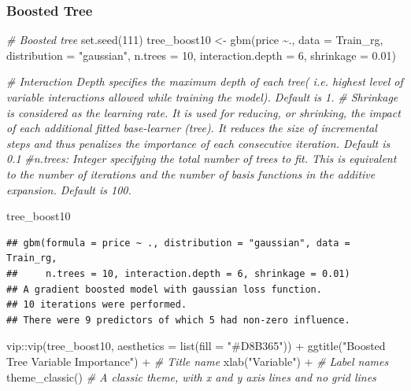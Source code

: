 \documentclass[
]{article}
\newenvironment{Shaded}{\begin{snugshade}}{\end{snugshade}}
\newcommand{\AttributeTok}[1]{\textcolor[rgb]{0.77,0.63,0.00}{#1}}
\newcommand{\CommentTok}[1]{\textcolor[rgb]{0.56,0.35,0.01}{\textit{#1}}}
\newcommand{\DecValTok}[1]{\textcolor[rgb]{0.00,0.00,0.81}{#1}}
\newcommand{\FloatTok}[1]{\textcolor[rgb]{0.00,0.00,0.81}{#1}}
\newcommand{\FunctionTok}[1]{\textcolor[rgb]{0.00,0.00,0.00}{#1}}
\newcommand{\NormalTok}[1]{#1}
\newcommand{\OtherTok}[1]{\textcolor[rgb]{0.56,0.35,0.01}{#1}}
\newcommand{\SpecialCharTok}[1]{\textcolor[rgb]{0.00,0.00,0.00}{#1}}
\newcommand{\StringTok}[1]{\textcolor[rgb]{0.31,0.60,0.02}{#1}}
\begin{document}
\hypertarget{boosted-tree}{%
\subsubsection{Boosted Tree}\label{boosted-tree}}

\begin{Shaded}
\begin{Highlighting}[]
\CommentTok{\# Boosted tree}
\FunctionTok{set.seed}\NormalTok{(}\DecValTok{111}\NormalTok{)}
\NormalTok{tree\_boost10 }\OtherTok{\textless{}{-}} \FunctionTok{gbm}\NormalTok{(price }\SpecialCharTok{\textasciitilde{}}\NormalTok{., }\AttributeTok{data =}\NormalTok{ Train\_rg, }\AttributeTok{distribution =} \StringTok{"gaussian"}\NormalTok{, }\AttributeTok{n.trees =} \DecValTok{10}\NormalTok{, }\AttributeTok{interaction.depth =} \DecValTok{6}\NormalTok{, }\AttributeTok{shrinkage =} \FloatTok{0.01}\NormalTok{)}

\CommentTok{\# Interaction Depth specifies the maximum depth of each tree( i.e. highest level of variable interactions allowed while training the model). Default is 1.}
\CommentTok{\# Shrinkage is considered as the learning rate. It is used for reducing, or shrinking, the impact of each additional fitted base{-}learner (tree).  It reduces the size of incremental steps and thus penalizes the importance of each consecutive iteration. Default is 0.1}
\CommentTok{\#n.trees: Integer specifying the total number of trees to fit. This is equivalent to the number of iterations and the number of basis functions in the additive expansion. Default is 100.}


\NormalTok{tree\_boost10}
\end{Highlighting}
\end{Shaded}

\begin{verbatim}
## gbm(formula = price ~ ., distribution = "gaussian", data = Train_rg,
##     n.trees = 10, interaction.depth = 6, shrinkage = 0.01)
## A gradient boosted model with gaussian loss function.
## 10 iterations were performed.
## There were 9 predictors of which 5 had non-zero influence.
\end{verbatim}

\begin{Shaded}
\begin{Highlighting}[]
\NormalTok{vip}\SpecialCharTok{::}\FunctionTok{vip}\NormalTok{(tree\_boost10, }\AttributeTok{aesthetics =} \FunctionTok{list}\NormalTok{(}\AttributeTok{fill =} \StringTok{"\#D8B365"}\NormalTok{)) }\SpecialCharTok{+}
  \FunctionTok{ggtitle}\NormalTok{(}\StringTok{"Boosted Tree Variable Importance"}\NormalTok{) }\SpecialCharTok{+} \CommentTok{\# Title name}
  \FunctionTok{xlab}\NormalTok{(}\StringTok{"Variable"}\NormalTok{) }\SpecialCharTok{+} \CommentTok{\# Label names}
  \FunctionTok{theme\_classic}\NormalTok{() }\CommentTok{\# A classic theme, with x and y axis lines and no grid lines}
\end{Highlighting}
\end{Shaded}
\end{document}
